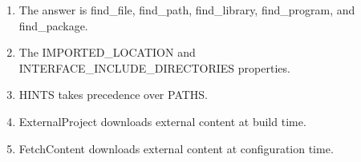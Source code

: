 

\begin{enumerate}
\item 
The answer is find\_file, find\_path, find\_library, find\_program, and find\_package.

\item
The IMPORTED\_LOCATION and INTERFACE\_INCLUDE\_DIRECTORIES properties.

\item 
HINTS takes precedence over PATHS.

\item 
ExternalProject downloads external content at build time.

\item 
FetchContent downloads external content at configuration time.
\end{enumerate}